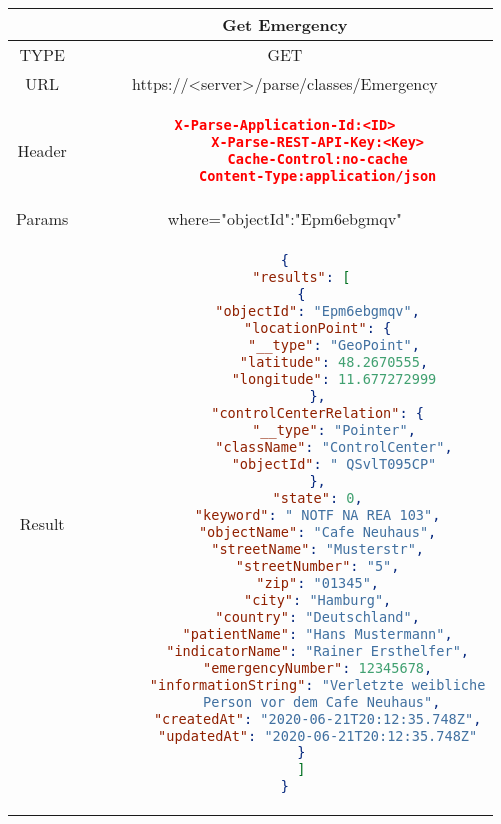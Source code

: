 \documentclass{article}
\begin{document}
	\begin{tabular}{ |c|c| }
		\hline
		& Get Emergency\\
		\hline \hline
		TYPE & GET \\ \hline
		URL & https://<server>/parse/classes/Emergency \\ \hline
		Header & \begin{lstlisting}[language=json,firstnumber=1]
		X-Parse-Application-Id:<ID>
		X-Parse-REST-API-Key:<Key>
		Cache-Control:no-cache
		Content-Type:application/json
		\end{lstlisting} \\ \hline
		Params & where={"objectId":"Epm6ebgmqv"} \\ \hline
		Result &\begin{lstlisting}[language=json,firstnumber=1]
{
	"results": [
	{
		"objectId": "Epm6ebgmqv",
		"locationPoint": {
			"__type": "GeoPoint",
			"latitude": 48.2670555,
			"longitude": 11.677272999
		},
		"controlCenterRelation": {
			"__type": "Pointer",
			"className": "ControlCenter",
			"objectId": " QSvlT095CP"
		},
		"state": 0,
		"keyword": " NOTF NA REA 103",
		"objectName": "Cafe Neuhaus",
		"streetName": "Musterstr",
		"streetNumber": "5",
		"zip": "01345",
		"city": "Hamburg",
		"country": "Deutschland",
		"patientName": "Hans Mustermann",
		"indicatorName": "Rainer Ersthelfer",
		"emergencyNumber": 12345678,
		"informationString": "Verletzte weibliche
		 Person vor dem Cafe Neuhaus",
		"createdAt": "2020-06-21T20:12:35.748Z",
		"updatedAt": "2020-06-21T20:12:35.748Z"
	}
	]
}
		\end{lstlisting} \\ \hline
	\end{tabular}
	
	
\end{document}
